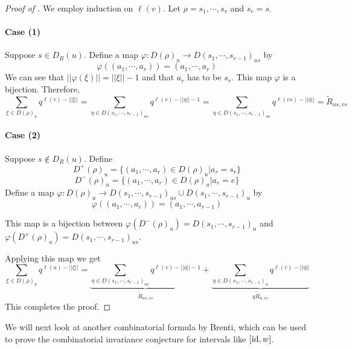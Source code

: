 \begin{proof}[Proof of ]
	We employ induction on $\ell(v)$. Let $\rho=s_1,\cdots,s_r$ and $s_r=s$.
	\paragraph{Case (1)} Suppose $s\in D_R(u)$. Define a map
	\(\varphi:D(\rho)_u\to D(s_1,\cdots,s_{r-1})_{us}\) by
	\[\varphi((a_1,\cdots,a_r))=(a_1,\cdots,a_r)\]
	We can see that $||\varphi(\xi)||=||\xi||-1$ and that $a_r$ has to be $s_r$. This map $\varphi$ is a bijection.
	Therefore,
	\[\sum_{\xi\in D(\rho)_u} q^{\ell(v)-||\xi||}=\sum_{\eta\in D(s_1,\cdots,s_{r-1})_{us}}q^{\ell(v)-||\eta||-1}=\sum_{\eta\in D(s_1,\cdots,s_{r-1})_{us}}q^{\ell(vs)-||\eta||}=\tilde R_{us,vs}\]
	\paragraph{Case (2)} Suppose $s\notin D_R(u)$. Define
	\[D^+(\rho)_u=\{(a_1,\cdots,a_r)\in D(\rho)_u | a_r=s_r\}\]
	\[D^-(\rho)_u=\{(a_1,\cdots,a_r)\in D(\rho)_u|a_r=e\}\]
	Define a map $\varphi:D(\rho)_u\to D(s_1,\cdots,s_{r-1})_{us}\cup D(s_1,\cdots,s_{r-1})_u$ by
	\[\varphi((a_1,\cdots,a_r))=(a_1,\cdots,a_{r-1})\]
	
	This map is a bijection between $\varphi(D^-(\rho)_u)=D(s_1,\cdots,s_{r-1})_u$ and $\varphi(D^+(\rho)_u)=D(s_1,\cdots,s_{r-1})_{us}$.
	
	Applying this map we get
	\[
	\sum_{\xi\in D(\rho)_u}q^{\ell(u)-||\xi||}=\underbrace{\sum_{\eta\in D(s_1,\cdots,s_{r-1})_{us}}q^{\ell(v)-||\eta||-1}}_{\tilde R_{us,vs}}+\underbrace{\sum_{\eta\in D(s_1,\cdots,s_{r-1})_u}q^{\ell(v)-||\eta||}}_{q\tilde R_{u,vs}}\]
	This completes the proof.
\end{proof}

We will next look at another combinatorial formula by Brenti, which can be used to prove the combinatorial invariance conjecture for intervals like $[\operatorname{id},w]$.

